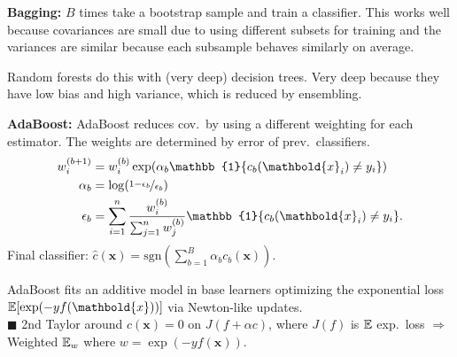 \documentclass[9pt]{extarticle}
\newenvironment{topic}[1]
{\textbf{\sffamily \colorbox{black}{\rlap{\textbf{\textcolor{white}{#1}}}\hspace{\linewidth}\hspace{-2\fboxsep}}}}
{}
\newenvironment{subtopic}[1]
{\textbf{\sffamily #1:}}
{}
\renewcommand{\vec}[1]{\ensuremath{\mathbold{#1}}}
\begin{document}
\begin{multicols*}{3}
\begin{topic}{Ensembles}
        \begin{subtopic}{Bagging}
            $B$ times take a bootstrap sample and train a classifier. This works well because
            covariances are small due to using different subsets for training and the variances are
            similar because each subsample behaves similarly on average.

            Random forests do this with (very deep) decision trees. Very deep because they have low bias and
            high variance, which is reduced by ensembling.

        \end{subtopic}

        \begin{subtopic}{AdaBoost}
            AdaBoost reduces cov.\ by using a different weighting for each estimator. The weights are
            determined by error of prev.\ classifiers.
            \begin{align*}
                w_i^{(b+1)} & = w_i^{(b)} \exp(\alpha_b \mathbb{1}\{ c_b(\vec{x}_i) \neq y_i \})                                   \\
                \alpha_b    & = \log \lft( \nicefrac{1-\epsilon_b}{\epsilon_b} \rgt)                                               \\
                \epsilon_b  & = \sum_{i=1}^{n} \frac{w_i^{(b)}}{\sum_{j=1}^{n} w_j^{(b)}} \mathbb{1}\{ c_b(\vec{x}_i) \neq y_i \}.
            \end{align*}
            Final classifier: $\hat{c}(\vec{x}) = \mathrm{sgn}(\sum_{b=1}^{B} \alpha_b c_b(\vec{x}))$.

            AdaBoost fits an additive model in base learners optimizing the exponential loss
            $\E[\exp(-yf(\vec{x}))]$ via Newton-like updates.\\ $\blacksquare$ 2nd Taylor around $c(\vec{x}) =
                0$ on $J(f + \alpha c)$, where $J(f)$ is $\mathbb{E}$ exp.\ loss $\Rightarrow$ Weighted $\mathbb{E}_w$ where
            $w=\exp(-yf(\vec{x}))$.

        \end{subtopic}

    \end{topic}

    \begin{topic}{Stable diffusion}


\end{topic}
\end{multicols*}
\end{document}
